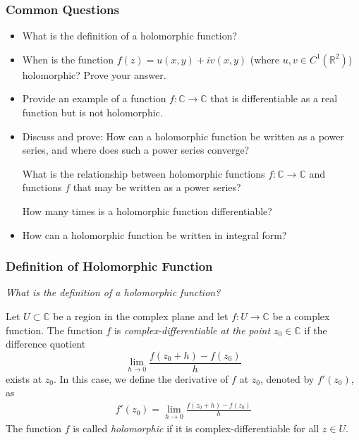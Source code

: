 \documentclass[11pt, a4paper]{article}
\newcommand{\question}[1]{\textit{#1}\vspace{2mm}}
\newcommand{\R}{\mathbb{R}} %
\newcommand{\C}{\mathbb{C}} %
\begin{document}
\subsubsection{Common Questions}
\begin{itemize}
	\item What is the definition of a holomorphic function?
	
	\item When is the function $ f(z) = u(x, y) + iv(x, y) $ (where $ u, v \in C^{1}(\R^2)$) holomorphic? Prove your answer. 
	
	\item Provide an example of a function $ f: \C \to \C $ that is differentiable as a real function but is not holomorphic.
	
	\item Discuss and prove: How can a holomorphic function be written as a power series, and where does such a power series converge?
	
	What is the relationship between holomorphic functions $ f:\C \to \C $ and functions $ f $ that may be written as a power series?
	
	How many times is a holomorphic function differentiable? 
	
	 \item How can a holomorphic function be written in integral form? 

\end{itemize}

\subsubsection{Definition of  Holomorphic Function}
\question{What is the definition of a holomorphic function?}

Let $ U \subset \C $ be a region in the complex plane and let $ f : U \to \C $ be a complex function. The function $ f $ is \textit{complex-differentiable at the point $ z_0 \in \C $} if the difference quotient
\begin{equation*}
	\lim_{h \to 0} \frac{f(z_0 + h) - f(z_0)}{h}
\end{equation*} 
exists at $ z_0 $. In this case, we define the derivative of $ f $ at $ z_0 $, denoted by $ f'(z_0) $, as
\begin{align*}
	f'(z_0) = \lim_{h \to 0} \frac{f(z_0 + h) - f(z_0)}{h}
\end{align*}
The function $ f $ is called \textit{holomorphic} if it is complex-differentiable for all $ z \in U $.
\end{document}
